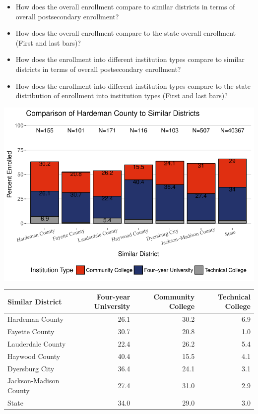 \documentclass[11pt,]{article}
\providecommand{\tightlist}{%
  \setlength{\itemsep}{0pt}\setlength{\parskip}{0pt}}
\begin{document}
\begin{itemize}
\tightlist
\item
  How does the overall enrollment compare to similar districts in terms
  of overall postsecondary enrollment?\\
\item
  How does the overall enrollment compare to the state overall
  enrollment (First and last bars)?\\
\item
  How does the enrollment into different institution types compare to
  similar districts in terms of overall postsecondary enrollment?\\
\item
  How does the enrollment into different institution types compare to
  the state distribution of enrollment into institution types (First and
  last bars)?
\end{itemize}

\includegraphics{20170424_PSWRR_files/figure-latex/comparison_districts-1.pdf}

\begin{longtable}[]{@{}lrrr@{}}
\toprule
Similar District & Four-year University & Community College & Technical
College\tabularnewline
\midrule
\endhead
Hardeman County & 26.1 & 30.2 & 6.9\tabularnewline
Fayette County & 30.7 & 20.8 & 1.0\tabularnewline
Lauderdale County & 22.4 & 26.2 & 5.4\tabularnewline
Haywood County & 40.4 & 15.5 & 4.1\tabularnewline
Dyersburg City & 36.4 & 24.1 & 3.1\tabularnewline
Jackson-Madison County & 27.4 & 31.0 & 2.9\tabularnewline
State & 34.0 & 29.0 & 3.0\tabularnewline
\bottomrule
\end{longtable}
\end{document}
